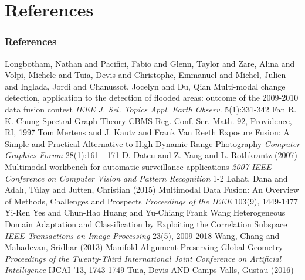 \documentclass{beamer}
\begin{document}
\section{References}
\begin{frame}[allowframebreaks]
  \frametitle{References}
  \footnotesize{
    \begin{thebibliography}{99} %
     Longbotham, Nathan and Pacifici, Fabio and Glenn, Taylor and Zare, Alina and Volpi, Michele and Tuia, Devis and Christophe, Emmanuel and Michel, Julien and Inglada, Jordi and Chanussot, Jocelyn and Du, Qian
      \newblock Multi-modal change detection, application to the detection of flooded areas: outcome of the 2009-2010 data fusion contest
      \newblock \emph{IEEE J. Sel. Topics Appl. Earth Observ.} 5(1):331-342
     Fan R. K. Chung
      \newblock Spectral Graph Theory
      \newblock CBMS Reg. Conf. Ser. Math. 92, Providence, RI, 1997
     Tom Mertens and J. Kautz and Frank Van Reeth
      \newblock Exposure Fusion: A Simple and Practical Alternative to High Dynamic Range Photography
      \newblock \emph{Computer Graphics Forum} 28(1):161 - 171
     D. Datcu and Z. Yang and L. Rothkrantz (2007)
      \newblock Multimodal workbench for automatic surveillance applications
      \newblock \emph{2007 IEEE Conference on Computer Vision and Pattern Recognition} 1-2
     Lahat, Dana and Adal{\i}, T{\"u}lay and Jutten, Christian (2015)
      \newblock Multimodal Data Fusion: An Overview of Methods, Challenges and Prospects
      \newblock \emph{Proceedings of the IEEE } 103(9), 1449-1477
     Yi-Ren Yes and Chun-Hao Huang and Yu-Chiang Frank Wang
      \newblock Heterogeneous Domain Adaptation and Classification by Exploiting the Correlation Subspace
      \newblock \emph{IEEE Transactions on Image Processing} 23(5), 2009-2018
     Wang, Chang and Mahadevan, Sridhar (2013)
      \newblock Manifold Alignment Preserving Global Geometry
      \newblock \emph{Proceedings of the Twenty-Third International Joint Conference on Artificial Intelligence} IJCAI '13, 1743-1749
     Tuia, Devis AND Camps-Valls, Gustau (2016)

\end{thebibliography}}
\end{frame}
\end{document}

